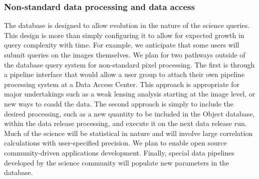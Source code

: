 \documentclass{emulateapj}
\begin{document}
\subsubsection{ Non-standard data processing and data access}

The database is designed to allow evolution in the nature of the science queries. 
This design is more than simply configuring it
to allow for expected growth in query complexity with time. For
example, we anticipate that some users will submit queries on the images 
themselves. We plan for two pathways outside of the database query system
for non-standard pixel processing. The first is through a pipeline interface
that would allow a user group to attach their own pipeline processing system
at a Data Access Center. This approach is appropriate for major undertakings 
such as a weak lensing analysis starting at the image level,
or new ways to coadd the data. The second approach is simply to include the 
desired processing, such as a new quantity to be included in the Object database, 
within the data release processing, and execute it on the next data release 
run. Much of the science will be statistical in nature and will involve large 
correlation calculations with user-specified precision. We plan to enable
open source community-driven applications development. Finally, special data 
pipelines developed by the science community %
will populate new parameters in the database. 
\end{document}
